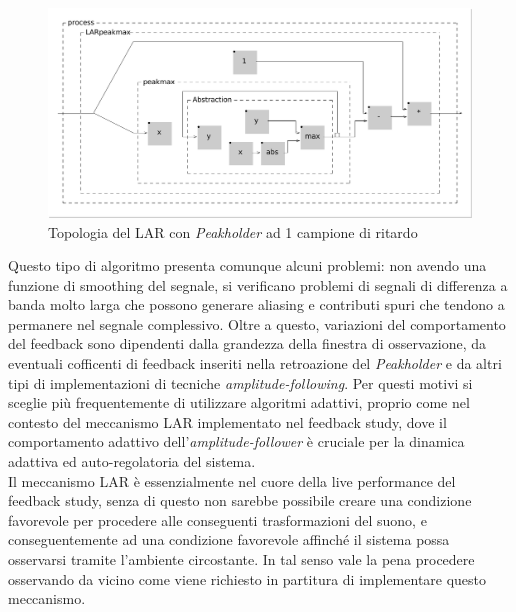 \begin{figure}[h!]
\begin{center}
    \includegraphics[width=14cm]{figures/LARpeakmax.pdf} 
    \caption{Topologia del LAR con \textit{Peakholder} ad 1 campione di ritardo} 
\end{center}
\vspace{0.5cm}
\end{figure} 

Questo tipo di algoritmo presenta comunque alcuni problemi: non avendo
una funzione di smoothing del segnale, si verificano problemi di segnali di differenza a banda
molto larga che possono generare aliasing e contributi spuri che tendono a permanere nel
segnale complessivo.
Oltre a questo, variazioni del comportamento del feedback sono dipendenti dalla grandezza
della finestra di osservazione, da eventuali cofficenti di feedback inseriti nella
retroazione del \textit{Peakholder} e da altri tipi di implementazioni di tecniche 
\textit{amplitude-following}. Per questi motivi si sceglie più frequentemente di utilizzare algoritmi
adattivi, proprio come nel contesto del meccanismo LAR implementato nel feedback study,
dove il comportamento adattivo dell'\textit{amplitude-follower} è cruciale
per la dinamica adattiva ed auto-regolatoria del sistema.\\
Il meccanismo LAR è essenzialmente nel cuore della live performance del feedback study,
senza di questo non sarebbe possibile creare una condizione favorevole per procedere alle 
conseguenti trasformazioni del suono, e conseguentemente ad una condizione favorevole affinché il 
sistema possa osservarsi tramite l'ambiente circostante. 
In tal senso vale la pena procedere osservando da vicino come viene richiesto in partitura 
di implementare questo meccanismo.

